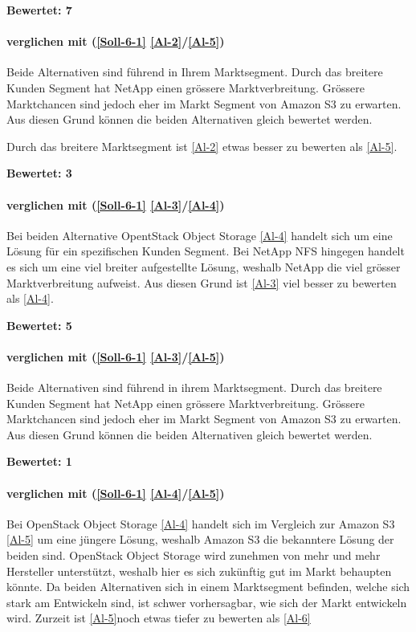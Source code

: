 \textbf{Bewertet: 7}

\paragraph*{  verglichen mit  (\ref{Soll-6-1} \ref{Al-2}/\ref{Al-5})}
Beide Alternativen sind führend in Ihrem Marktsegment. Durch das breitere Kunden Segment hat NetApp einen grössere Marktverbreitung. Grössere Marktchancen sind jedoch eher im Markt Segment von Amazon S3 zu erwarten. Aus diesen Grund können die beiden Alternativen gleich bewertet werden.

Durch das breitere Marktsegment ist  \ref{Al-2} etwas besser zu bewerten als  \ref{Al-5}.

\textbf{Bewertet: 3}

\paragraph*{  verglichen mit  (\ref{Soll-6-1} \ref{Al-3}/\ref{Al-4})}
Bei beiden Alternative OpentStack Object Storage \ref{Al-4} handelt sich um eine Lösung für ein spezifischen Kunden Segment. Bei NetApp NFS hingegen handelt es sich um eine viel breiter aufgestellte Lösung, weshalb NetApp die viel grösser Marktverbreitung aufweist. Aus diesen Grund ist  \ref{Al-3} viel besser zu bewerten als  \ref{Al-4}.

\textbf{Bewertet: 5}

\paragraph*{  verglichen mit  (\ref{Soll-6-1} \ref{Al-3}/\ref{Al-5})}
Beide Alternativen sind führend in ihrem Marktsegment. Durch das breitere Kunden Segment hat NetApp einen grössere Marktverbreitung. Grössere Marktchancen sind jedoch eher im Markt Segment von Amazon S3 zu erwarten. Aus diesen Grund können die beiden Alternativen gleich bewertet werden.

\textbf{Bewertet: 1}


\paragraph*{  verglichen mit  (\ref{Soll-6-1} \ref{Al-4}/\ref{Al-5})}
Bei OpenStack Object Storage \ref{Al-4} handelt sich im Vergleich zur Amazon S3 \ref{Al-5} um eine jüngere Lösung, weshalb Amazon S3 die bekanntere Lösung der beiden sind. OpenStack Object Storage wird zunehmen von mehr und mehr Hersteller unterstützt, weshalb hier es sich zukünftig gut im Markt behaupten könnte. Da beiden Alternativen sich in einem Marktsegment befinden, welche sich stark am Entwickeln sind, ist schwer vorhersagbar, wie sich der Markt entwickeln wird. Zurzeit ist \ref{Al-5}noch etwas tiefer zu bewerten als \ref{Al-6}

